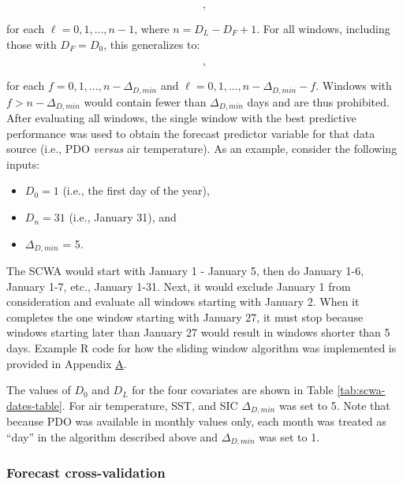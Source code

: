 \documentclass[12pt,]{book}
\providecommand{\tightlist}{%
  \setlength{\itemsep}{0pt}\setlength{\parskip}{0pt}}
\theoremstyle{definition}
\theoremstyle{definition}
\theoremstyle{definition}
\theoremstyle{remark}
\begin{document}
\begin{equation}
  [D_0, D_0 + \Delta_{D,min} - 1 + \ell],
\label{eq:scwa-1}
\end{equation}

\noindent
for each \(\ell = 0, 1, ..., n - 1\), where \(n = D_L - D_F + 1\). For
all windows, including those with \(D_F = D_0\), this generalizes to:

\begin{equation}
  [D_0 + f, D_0 + f + \Delta_{D,min} - 1 + \ell],
\label{eq:scwa-2}
\end{equation}

\noindent
for each \(f = 0, 1, ..., n - \Delta_{D,min}\) and
\(\ell = 0, 1, ..., n - \Delta_{D,min} - f\). Windows with
\(f > n - \Delta_{D,min}\) would contain fewer than \(\Delta_{D,min}\)
days and are thus prohibited. After evaluating all windows, the single
window with the best predictive performance was used to obtain the
forecast predictor variable for that data source (i.e., PDO
\emph{versus} air temperature). As an example, consider the following
inputs:

\begin{itemize}
\tightlist
\item
  \(D_0 = 1\) (i.e., the first day of the year),
\item
  \(D_n = 31\) (i.e., January 31), and
\item
  \(\Delta_{D,min}\) = 5.
\end{itemize}

The SCWA would start with January 1 - January 5, then do January 1-6,
January 1-7, etc., January 1-31. Next, it would exclude January 1 from
consideration and evaluate all windows starting with January 2. When it
completes the one window starting with January 27, it must stop because
windows starting later than January 27 would result in windows shorter
than 5 days. Example R code for how the sliding window algorithm was
implemented is provided in Appendix \protect\hyperlink{appendix-a}{A}.

The values of \(D_0\) and \(D_L\) for the four covariates are shown in
Table \ref{tab:scwa-dates-table}. For air temperature, SST, and SIC
\(\Delta_{D,min}\) was set to 5. Note that because PDO was available in
monthly values only, each month was treated as ``day'' in the algorithm
described above and \(\Delta_{D,min}\) was set to 1.

\subsubsection{Forecast cross-validation}\label{fcst-cv}
\end{document}
